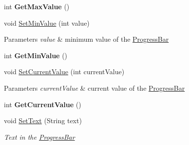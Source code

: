 \begin{DoxyCompactItemize}
int {\bfseries Get\+Max\+Value} ()
\item 
\mbox{\label{class_space_v_i_l_1_1_progress_bar_a9c3c5736106e1240eb2480d25c3b9a3d}} 
void \mbox{\hyperlink{class_space_v_i_l_1_1_progress_bar_a9c3c5736106e1240eb2480d25c3b9a3d}{Set\+Min\+Value}} (int value)
\begin{DoxyCompactList}\small\item\em 
\begin{DoxyParams}{Parameters}
{\em value} & minimum value of the \mbox{\hyperlink{class_space_v_i_l_1_1_progress_bar}{Progress\+Bar}} \\
\hline
\end{DoxyParams}
\end{DoxyCompactList}\item 
\mbox{\label{class_space_v_i_l_1_1_progress_bar_a61104b0745bda5d5a774e66915568eac}} 
int {\bfseries Get\+Min\+Value} ()
\item 
\mbox{\label{class_space_v_i_l_1_1_progress_bar_a2ac9f82582b7c30e432e65fda1624792}} 
void \mbox{\hyperlink{class_space_v_i_l_1_1_progress_bar_a2ac9f82582b7c30e432e65fda1624792}{Set\+Current\+Value}} (int current\+Value)
\begin{DoxyCompactList}\small\item\em 
\begin{DoxyParams}{Parameters}
{\em current\+Value} & current value of the \mbox{\hyperlink{class_space_v_i_l_1_1_progress_bar}{Progress\+Bar}} \\
\hline
\end{DoxyParams}
\end{DoxyCompactList}\item 
\mbox{\label{class_space_v_i_l_1_1_progress_bar_a1b629582591041d4ba0469307d488ac0}} 
int {\bfseries Get\+Current\+Value} ()
\item 
void \mbox{\hyperlink{class_space_v_i_l_1_1_progress_bar_a7e2ce10be7d00af8599913bc474c8ffc}{Set\+Text}} (String text)
\begin{DoxyCompactList}\small\item\em Text in the \mbox{\hyperlink{class_space_v_i_l_1_1_progress_bar}{Progress\+Bar}} \end{DoxyCompactList}\item 

\end{DoxyCompactItemize}
